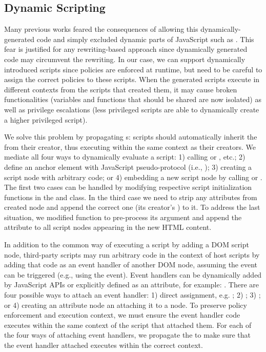 \subsection{Dynamic Scripting}
\label{sec:esorics_impl_dynamicscripts}
Many previous works feared the consequences of allowing this dynamically-generated code and simply excluded dynamic parts of JavaScript such as .  This fear is justified for any rewriting-based approach since dynamically generated code may circumvent the rewriting.  In our case, we can support dynamically introduced scripts since policies are enforced at runtime, but need to be careful to assign the correct policies to these scripts.  When the generated scripts execute in different contexts from the scripts that created them, it may cause broken functionalities (variables and functions that should be shared are now isolated) as well as privilege escalations (less privileged scripts are able to dynamically create a higher privileged script).  

We solve this problem by propagating s: scripts should automatically inherit the  from their creator, thus executing within the same context as their creators. We mediate all four ways to dynamically evaluate a script: 1) calling  or , etc.; 2) define an anchor element with JavaScript pseudo-protocol (i.e., ); 3) creating a script node with arbitrary code;  or 4) embedding a new script node by calling  or .  The first two cases can be handled by modifying respective script initialization functions in the  and  class.  In the third case we need to strip any  attributes from created node and append the correct one (its creator's ) to it.  To address the last situation, we modified  function to pre-process its argument and append the  attribute to all script nodes appearing in the new HTML content. 

 In addition to the common way of executing a script by adding a DOM script node, third-party scripts may run arbitrary code in the context of host scripts by adding that code as an event handler of another DOM node, assuming the event can be triggered (e.g., using the  event).  Event handlers can be dynamically added by JavaScript APIs or explicitly defined as an attribute, for example: .   There are four possible ways to attach an event handler: 1) direct assignment, e.g. ; 2) ; 3) ; or 4) creating an attribute node an attaching it to a node.  To preserve policy enforcement and execution context, we must ensure the event handler code executes within the same context of the script that attached them.  For each of the four ways of attaching event handlers, we propagate the  to make sure that the event handler attached executes within the correct context.  

